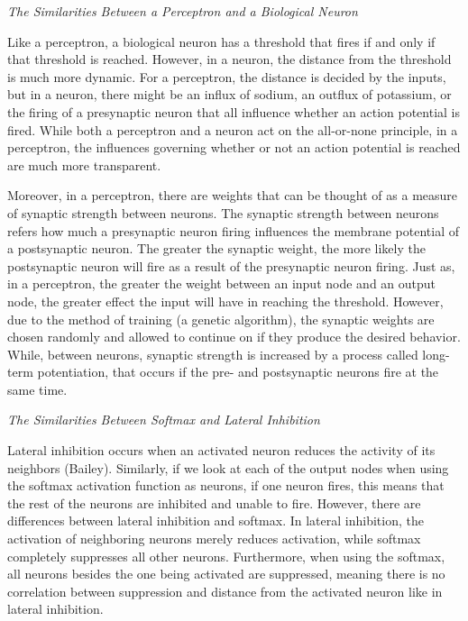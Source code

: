\documentclass[12pt]{article}
\begin{document}
\begin{flushleft}
\noindent\emph{The Similarities Between a Perceptron and a Biological Neuron}

Like a perceptron, a biological neuron has a threshold that fires if and only if that threshold is reached. However, in a neuron, the distance from the threshold is much more dynamic. For a perceptron, the distance is decided by the inputs, but in a neuron, there might be an influx of sodium, an outflux of potassium, or the firing of a presynaptic neuron that all influence whether an action potential is fired. While both a perceptron and a neuron act on the all-or-none principle, in a perceptron, the influences governing whether or not an action potential is reached are much more transparent. 

Moreover, in a perceptron, there are weights that can be thought of as a measure of synaptic strength between neurons. The synaptic strength between neurons refers how much a presynaptic neuron firing influences the membrane potential of a postsynaptic neuron. The greater the synaptic weight, the more likely the postsynaptic neuron will fire as a result of the presynaptic neuron firing. Just as, in a perceptron, the greater the weight between an input node and an output node, the greater effect the input will have in reaching the threshold. However, due to the method of training (a genetic algorithm), the synaptic weights are chosen randomly and allowed to continue on if they produce the desired behavior. While, between neurons, synaptic strength is increased by a process called long-term potentiation, that occurs if the pre- and postsynaptic neurons fire at the same time.

\hfill

\noindent\emph{The Similarities Between Softmax and Lateral Inhibition}

Lateral inhibition occurs when an activated neuron reduces the activity of its neighbors (Bailey). Similarly, if we look at each of the output nodes when using the softmax activation function as neurons, if one neuron fires, this means that the rest of the neurons are inhibited and unable to fire. However, there are differences between lateral inhibition and softmax. In lateral inhibition, the activation of neighboring neurons merely reduces activation, while softmax completely suppresses all other neurons. Furthermore, when using the softmax, all neurons besides the one being activated are suppressed, meaning there is no correlation between suppression and distance from the activated neuron like in lateral inhibition. 


\end{flushleft}
\end{document}
